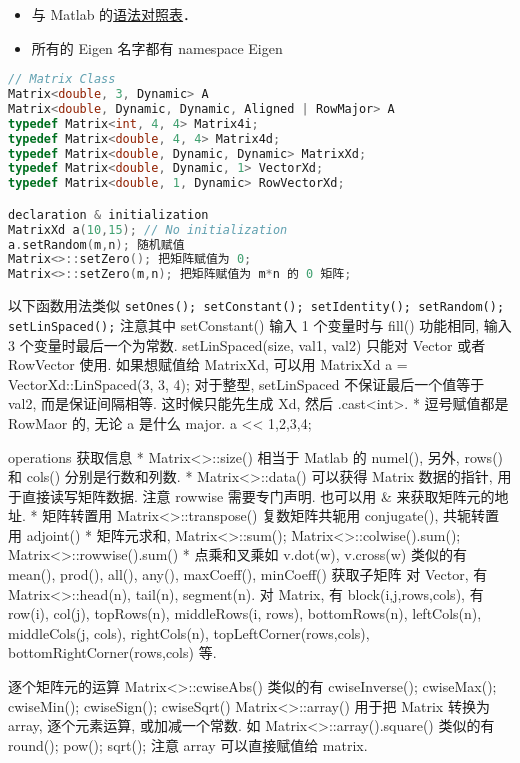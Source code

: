 
\begin{itemize}
\item 与 Matlab 的\href{https://eigen.tuxfamily.org/dox/AsciiQuickReference.txt}{语法对照表}．
\item 所有的 Eigen 名字都有 namespace Eigen
\end{itemize}

\begin{lstlisting}[language=cpp]
// Matrix Class
Matrix<double, 3, Dynamic> A
Matrix<double, Dynamic, Dynamic, Aligned | RowMajor> A
typedef Matrix<int, 4, 4> Matrix4i;
typedef Matrix<double, 4, 4> Matrix4d;
typedef Matrix<double, Dynamic, Dynamic> MatrixXd;
typedef Matrix<double, Dynamic, 1> VectorXd;
typedef Matrix<double, 1, Dynamic> RowVectorXd;

declaration & initialization
MatrixXd a(10,15); // No initialization
a.setRandom(m,n); 随机赋值
Matrix<>::setZero(); 把矩阵赋值为 0;
Matrix<>::setZero(m,n); 把矩阵赋值为 m*n 的 0 矩阵;
\end{lstlisting}

以下函数用法类似
\verb|setOnes(); setConstant(); setIdentity(); setRandom(); setLinSpaced();|
注意其中 setConstant() 输入 1 个变量时与 fill() 功能相同, 输入 3 个变量时最后一个为常数. setLinSpaced(size, val1, val2) 只能对 Vector 或者 RowVector 使用. 如果想赋值给 MatrixXd, 可以用 MatrixXd a = VectorXd::LinSpaced(3, 3, 4); 对于整型, setLinSpaced 不保证最后一个值等于 val2, 而是保证间隔相等. 这时候只能先生成 Xd, 然后 .cast<int>.
* 逗号赋值都是 RowMaor 的, 无论 a 是什么 major.
a << 1,2,3,4;

operations
获取信息
* Matrix<>::size() 相当于 Matlab 的 numel(), 另外, rows() 和 cols() 分别是行数和列数.
* Matrix<>::data() 可以获得 Matrix 数据的指针, 用于直接读写矩阵数据. 注意 rowwise 需要专门声明. 也可以用 & 来获取矩阵元的地址.
* 矩阵转置用 Matrix<>::transpose() 复数矩阵共轭用 conjugate(), 共轭转置用 adjoint()
* 矩阵元求和, Matrix<>::sum(); Matrix<>::colwise().sum(); Matrix<>::rowwise().sum()
* 点乘和叉乘如 v.dot(w), v.cross(w)
类似的有 mean(), prod(), all(), any(), maxCoeff(), minCoeff()
获取子矩阵
对 Vector, 有 Matrix<>::head(n), tail(n), segment(n). 对 Matrix, 有 block(i,j,rows,cols), 有 row(i), col(j), topRows(n), middleRows(i, rows), bottomRows(n), leftCols(n), middleCols(j, cols), rightCols(n), topLeftCorner(rows,cols), bottomRightCorner(rows,cols) 等.

逐个矩阵元的运算
Matrix<>::cwiseAbs()
类似的有 cwiseInverse(); cwiseMax(); cwiseMin(); cwiseSign(); cwiseSqrt()
Matrix<>::array() 用于把 Matrix 转换为 array, 逐个元素运算, 或加减一个常数. 如 Matrix<>::array().square()
类似的有 round(); pow(); sqrt(); 注意 array 可以直接赋值给 matrix.

